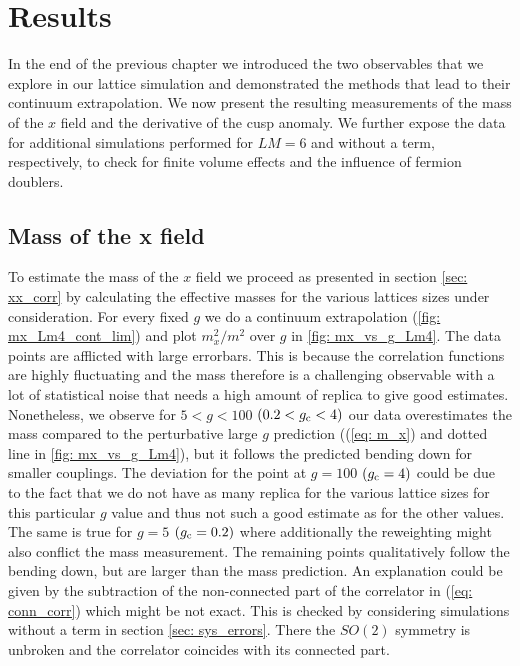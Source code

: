 \chapter{Results}
In the end of the previous chapter we introduced the two observables that we explore in our lattice simulation and demonstrated the methods that lead to their continuum extrapolation. We now present the resulting measurements of the mass of the $x$ field and the derivative of the cusp anomaly. We further expose the data for additional simulations performed for $LM=6$ and without a  term, respectively, to check for finite volume effects and the influence of fermion doublers.
%
%
%
%
%
%
\section[Mass of the x field]{Mass of the x field}
To estimate the mass of the $x$ field we proceed as presented in section \ref{sec: xx_corr} by calculating the effective masses for the various lattices sizes under consideration. For every fixed $g$ we do a continuum extrapolation (\autoref{fig: mx_Lm4_cont_lim}) and plot $m_{x}^{2}/m^{2}$ over $g$ in \autoref{fig: mx_vs_g_Lm4}. The data points are afflicted with large errorbars. This is because the correlation functions are highly fluctuating and the mass therefore is a challenging observable with a lot of statistical noise that needs a high amount of replica to give good estimates. Nonetheless, we observe for $5<g<100$ $(0.2<g_{\rm c}<4)$ %
our data overestimates the mass compared to the perturbative large $g$ prediction ((\ref{eq: m_x}) and dotted line in \autoref{fig: mx_vs_g_Lm4}), but it follows the predicted bending down for smaller couplings. The deviation for the point at $g=100$ $(g_{\rm c}=4)$ could be due to the fact that we do not have as many replica for the various lattice sizes for this particular $g$ value and thus not such a good estimate as for the other values. The same is true for $g=5$ $(g_{\rm c}=0.2)$ where additionally the reweighting might also conflict the mass measurement. The remaining points qualitatively follow the bending down, but are larger than the mass prediction. An explanation could be given by the subtraction of the non-connected part of the correlator in (\ref{eq: conn_corr}) which might be not exact. This is checked by considering simulations without a  term in section \ref{sec: sys_errors}. There the $SO(2)$ symmetry is unbroken and the correlator coincides with its connected part. 
